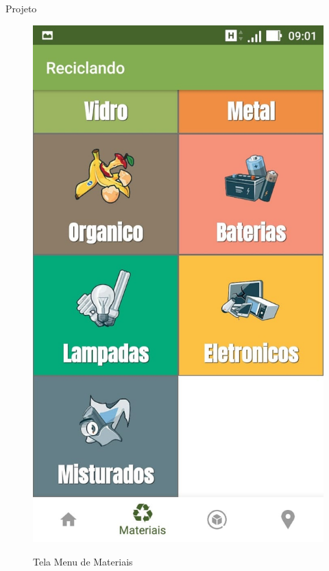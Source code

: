 \documentclass[
	12pt,				%
	openany,			%
	twoside,			%
	a4paper,			%
	english,			%
	french,				%
	spanish,			%
	brazil				%
	]{abntex2}
\begin{document}
\begin{chapter}{Projeto}
\begin{figure}[htb]
\begin{minipage}{0.45\textwidth}
     \label{fig:tela_menu_material_1}
  \end{minipage}
  \hfill
  \begin{minipage}{0.45\textwidth}
    \centering
    \caption{Tela Menu de Materiais}
    \includegraphics[scale=0.35]{media/tela_menu_material_2.jpg}
     \label{fig:tela_menu_material_2}
  \end{minipage}
\end{figure}


\end{chapter}
\end{document}
